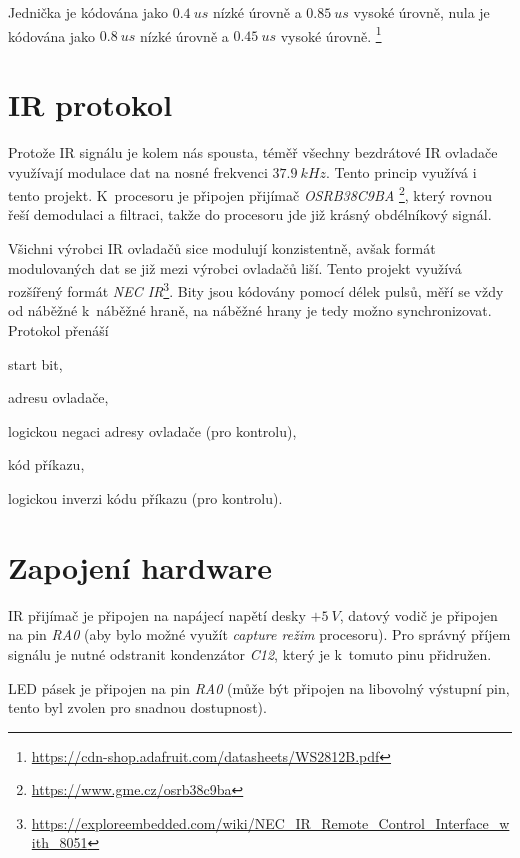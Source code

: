\documentclass[12pt,a4paper]{article}
\begin{document}
Jednička je kódována jako $0.4\ us$ nízké úrovně a $0.85\ us$ vysoké úrovně,
nula je kódována jako $0.8\ us$ nízké úrovně a $0.45\ us$ vysoké úrovně.
\footnote{\url{https://cdn-shop.adafruit.com/datasheets/WS2812B.pdf}}

\section{IR protokol}

Protože IR signálu je kolem nás spousta, téměř všechny bezdrátové IR ovladače
využívají modulace dat na nosné frekvenci $37.9\ kHz$. Tento princip využívá
i tento projekt. K~procesoru je připojen přijímač \textit{OSRB38C9BA}
\footnote{\url{https://www.gme.cz/osrb38c9ba}}, který rovnou řeší demodulaci
a filtraci, takže do procesoru jde již krásný obdélníkový signál.

Všichni výrobci IR ovladačů sice modulují konzistentně, avšak formát modulovaných
dat se již mezi výrobci ovladačů liší. Tento projekt využívá rozšířený formát
\textit{NEC IR}\footnote{\url{https://exploreembedded.com/wiki/NEC_IR_Remote_Control_Interface_with_8051}}.
Bity jsou kódovány pomocí délek pulsů, měří se vždy od náběžné k~náběžné hraně,
na náběžné hrany je tedy možno synchronizovat. Protokol přenáší

\begin{compactenum}
\item start bit,
\item adresu ovladače,
\item logickou negaci adresy ovladače (pro kontrolu),
\item kód příkazu,
\item logickou inverzi kódu příkazu (pro kontrolu).
\end{compactenum}

\section{Zapojení hardware}

IR přijímač je připojen na napájecí napětí desky $+5\ V$, datový vodič je
připojen na pin \textit{RA0} (aby bylo možné využít \textit{capture režim}
procesoru).  Pro správný příjem signálu je nutné odstranit kondenzátor
\textit{C12}, který je k~tomuto pinu přidružen.

LED pásek je připojen na pin \textit{RA0} (může být připojen na libovolný
výstupní pin, tento byl zvolen pro snadnou dostupnost).
\end{document}
